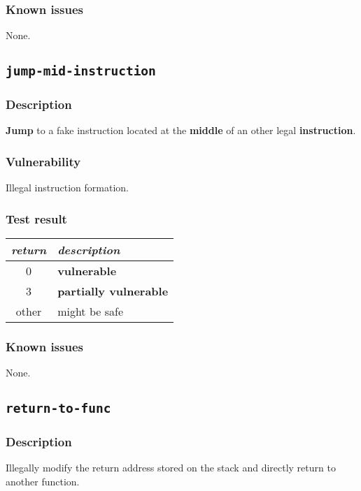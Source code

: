 \documentclass[a4paper]{book}
\begin{document}
\subsubsection{Known issues}

None.

\newpage
\subsection{\texttt{jump-mid-instruction}}\label{test-jump-mid-instruction}

\subsubsection{Description}
\textbf{Jump} to a fake instruction located at the \textbf{middle} of an other legal \textbf{instruction}.

\subsubsection{Vulnerability}
Illegal instruction formation.

\subsubsection{Test result}
\begin{tabular}{cl}
  \toprule
  \emph{return}  & \emph{description} \\
  \midrule
  0              & \textbf{vulnerable} \\
  3              & \textbf{partially vulnerable} \\
  other          & might be safe \\
  \bottomrule
\end{tabular}
  
\subsubsection{Known issues}

None.

\newpage
\subsection{\texttt{return-to-func}}\label{test-return-to-func}

\subsubsection{Description}
Illegally modify the return address stored on the stack and directly return to another function.
\end{document}
